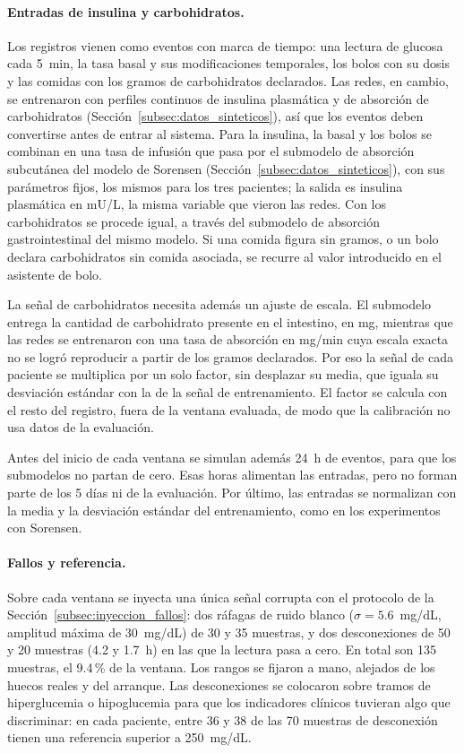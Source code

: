 \documentclass{report}
\begin{document}
\paragraph{Entradas de insulina y carbohidratos.} Los registros vienen como eventos con marca de tiempo: una lectura de glucosa cada 5~min, la tasa basal y sus modificaciones temporales, los bolos con su dosis y las comidas con los gramos de carbohidratos declarados. Las redes, en cambio, se entrenaron con perfiles continuos de insulina plasmática y de absorción de carbohidratos (Sección~\ref{subsec:datos_sinteticos}), así que los eventos deben convertirse antes de entrar al sistema. Para la insulina, la basal y los bolos se combinan en una tasa de infusión que pasa por el submodelo de absorción subcutánea del modelo de Sorensen (Sección~\ref{subsec:datos_sinteticos}), con sus parámetros fijos, los mismos para los tres pacientes; la salida es insulina plasmática en mU/L, la misma variable que vieron las redes. Con los carbohidratos se procede igual, a través del submodelo de absorción gastrointestinal del mismo modelo. Si una comida figura sin gramos, o un bolo declara carbohidratos sin comida asociada, se recurre al valor introducido en el asistente de bolo.
 
La señal de carbohidratos necesita además un ajuste de escala. El submodelo entrega la cantidad de carbohidrato presente en el intestino, en mg, mientras que las redes se entrenaron con una tasa de absorción en mg/min cuya escala exacta no se logró reproducir a partir de los gramos declarados. Por eso la señal de cada paciente se multiplica por un solo factor, sin desplazar su media, que iguala su desviación estándar con la de la señal de entrenamiento. El factor se calcula con el resto del registro, fuera de la ventana evaluada, de modo que la calibración no usa datos de la evaluación.
 
Antes del inicio de cada ventana se simulan además 24~h de eventos, para que los submodelos no partan de cero. Esas horas alimentan las entradas, pero no forman parte de los 5 días ni de la evaluación. Por último, las entradas se normalizan con la media y la desviación estándar del entrenamiento, como en los experimentos con Sorensen.
 
\paragraph{Fallos y referencia.} Sobre cada ventana se inyecta una única señal corrupta con el protocolo de la Sección~\ref{subsec:inyeccion_fallos}: dos ráfagas de ruido blanco ($\sigma = 5.6$~mg/dL, amplitud máxima de 30~mg/dL) de 30 y 35 muestras, y dos desconexiones de 50 y 20 muestras (4.2 y 1.7~h) en las que la lectura pasa a cero. En total son 135 muestras, el 9.4\,\% de la ventana. Los rangos se fijaron a mano, alejados de los huecos reales y del arranque. Las desconexiones se colocaron sobre tramos de hiperglucemia o hipoglucemia para que los indicadores clínicos tuvieran algo que discriminar: en cada paciente, entre 36 y 38 de las 70 muestras de desconexión tienen una referencia superior a 250~mg/dL.
 
\end{document}
